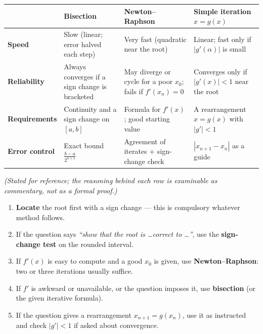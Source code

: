\documentclass[11pt]{article}
\begin{document}
\begin{propriete}
\begin{center}
\begin{tabularx}{\linewidth}{|l|X|X|X|}
\hline
\rowcolor{popblueL}
 & \textbf{Bisection} & \textbf{Newton--Raphson} & \textbf{Simple iteration } $x=g(x)$ \\
\hline
\textbf{Speed} & Slow (linear; error halved each step) & Very fast (quadratic near the root) & Linear; fast only if $|g'(\alpha)|$ is small \\
\hline
\textbf{Reliability} & Always converges if a sign change is bracketed & May diverge or cycle for a poor $x_0$; fails if $f'(x_n)=0$ & Converges only if $|g'(x)|<1$ near the root \\
\hline
\textbf{Requirements} & Continuity and a sign change on $[a,b]$ & Formula for $f'(x)$; good starting value & A rearrangement $x=g(x)$ with $|g'|<1$ \\
\hline
\textbf{Error control} & Exact bound $\frac{b-a}{2^{n+1}}$ & Agreement of iterates $+$ sign-change check & $|x_{n+1}-x_n|$ as a guide \\
\hline
\end{tabularx}
\end{center}
\emph{(Stated for reference; the reasoning behind each row is examinable as commentary, not as a formal proof.)}
\end{propriete}

\begin{methode}
\begin{enumerate}
\item \textbf{Locate} the root first with a sign change --- this is compulsory whatever method follows.
\item If the question says \emph{``show that the root is \ldots correct to \ldots''}, use the \textbf{sign-change test} on the rounded interval.
\item If $f'(x)$ is easy to compute and a good $x_0$ is given, use \textbf{Newton--Raphson}: two or three iterations usually suffice.
\item If $f'$ is awkward or unavailable, or the question imposes it, use \textbf{bisection} (or the given iterative formula).
\item If the question gives a rearrangement $x_{n+1}=g(x_n)$, use it as instructed and check $|g'|<1$ if asked about convergence.
\end{enumerate}
\end{methode}
\end{document}

